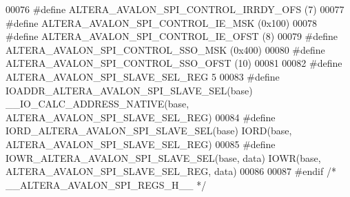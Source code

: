 \begin{DoxyCode}
00076 \textcolor{preprocessor}{#define ALTERA\_AVALON\_SPI\_CONTROL\_IRRDY\_OFS           (7)}
00077 \textcolor{preprocessor}{#define ALTERA\_AVALON\_SPI\_CONTROL\_IE\_MSK              (0x100)}
00078 \textcolor{preprocessor}{#define ALTERA\_AVALON\_SPI\_CONTROL\_IE\_OFST             (8)}
00079 \textcolor{preprocessor}{#define ALTERA\_AVALON\_SPI\_CONTROL\_SSO\_MSK             (0x400)}
00080 \textcolor{preprocessor}{#define ALTERA\_AVALON\_SPI\_CONTROL\_SSO\_OFST            (10)}
00081 
00082 \textcolor{preprocessor}{#define ALTERA\_AVALON\_SPI\_SLAVE\_SEL\_REG               5}
00083 \textcolor{preprocessor}{#define IOADDR\_ALTERA\_AVALON\_SPI\_SLAVE\_SEL(base)      \_\_IO\_CALC\_ADDRESS\_NATIVE(base,
       ALTERA\_AVALON\_SPI\_SLAVE\_SEL\_REG)}
00084 \textcolor{preprocessor}{#define IORD\_ALTERA\_AVALON\_SPI\_SLAVE\_SEL(base)        IORD(base, ALTERA\_AVALON\_SPI\_SLAVE\_SEL\_REG) }
00085 \textcolor{preprocessor}{#define IOWR\_ALTERA\_AVALON\_SPI\_SLAVE\_SEL(base, data)  IOWR(base, ALTERA\_AVALON\_SPI\_SLAVE\_SEL\_REG, data)}
00086 
00087 \textcolor{preprocessor}{#endif }\textcolor{comment}{/* \_\_ALTERA\_AVALON\_SPI\_REGS\_H\_\_ */}\textcolor{preprocessor}{}
\end{DoxyCode}
